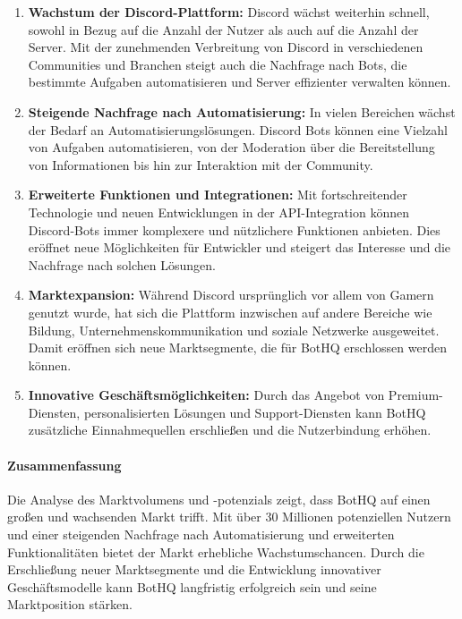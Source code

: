 \begin{enumerate}
  \item \textbf{Wachstum der Discord-Plattform:}
  Discord wächst weiterhin schnell, sowohl in Bezug auf die Anzahl der Nutzer als auch auf die Anzahl der Server. Mit der zunehmenden Verbreitung von Discord in verschiedenen Communities und Branchen steigt auch die Nachfrage nach Bots, die bestimmte Aufgaben automatisieren und Server effizienter verwalten können.

  \item \textbf{Steigende Nachfrage nach Automatisierung:}
  In vielen Bereichen wächst der Bedarf an Automatisierungslösungen. Discord Bots können eine Vielzahl von Aufgaben automatisieren, von der Moderation über die Bereitstellung von Informationen bis hin zur Interaktion mit der Community.

  \item \textbf{Erweiterte Funktionen und Integrationen:}
  Mit fortschreitender Technologie und neuen Entwicklungen in der API-Integration können Discord-Bots immer komplexere und nützlichere Funktionen anbieten. Dies eröffnet neue Möglichkeiten für Entwickler und steigert das Interesse und die Nachfrage nach solchen Lösungen.

  \item \textbf{Marktexpansion:}
  Während Discord ursprünglich vor allem von Gamern genutzt wurde, hat sich die Plattform inzwischen auf andere Bereiche wie Bildung, Unternehmenskommunikation und soziale Netzwerke ausgeweitet. Damit eröffnen sich neue Marktsegmente, die für BotHQ erschlossen werden können.

  \item \textbf{Innovative Geschäftsmöglichkeiten:}
  Durch das Angebot von Premium-Diensten, personalisierten Lösungen und Support-Diensten kann BotHQ zusätzliche Einnahmequellen erschließen und die Nutzerbindung erhöhen.
\end{enumerate}

\paragraph{Zusammenfassung}
Die Analyse des Marktvolumens und -potenzials zeigt, dass BotHQ auf einen großen und wachsenden Markt trifft. Mit über 30 Millionen potenziellen Nutzern und einer steigenden Nachfrage nach Automatisierung und erweiterten Funktionalitäten bietet der Markt erhebliche Wachstumschancen. Durch die Erschließung neuer Marktsegmente und die Entwicklung innovativer Geschäftsmodelle kann BotHQ langfristig erfolgreich sein und seine Marktposition stärken.

